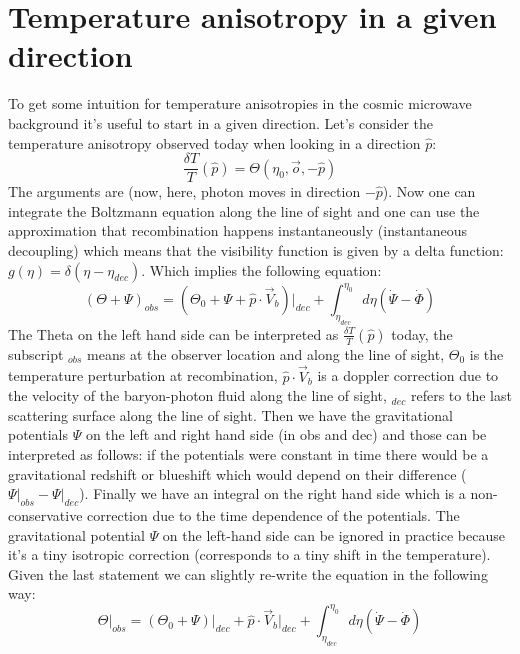 \documentclass{article}
\begin{document}
\section{Temperature anisotropy in a given direction}
To get some intuition for temperature anisotropies in the cosmic microwave background it's useful to start in a given direction. Let's consider the temperature anisotropy observed today when looking in a direction $\hat{p}$:
\begin{equation}
\frac{\delta T}{T}(\hat{p}) = \Theta(\eta_0,\vec{o},-\hat{p})
\end{equation}
The arguments are (now, here, photon moves in direction $-\hat{p}$). Now one can integrate the Boltzmann equation along the line of sight and one can use the approximation that recombination happens instantaneously (instantaneous decoupling) which means that the visibility function is given by a delta function: $g(\eta)=\delta(\eta-\eta_{dec})$. Which implies the following equation:
\begin{equation}
  (\Theta + \Psi)_{obs} = \left(\Theta_0 + \Psi + \hat{p}\cdot\vec{V}_b\right)\bigg|_{dec} + \int_{\eta_{dec}}^{\eta_0}d\eta (\dot{\Psi} - \dot{\Phi})
\end{equation}
The Theta on the left hand side can be interpreted as $\frac{\delta T}{T}(\hat{p})$ today, the subscript $_{obs}$ means at the observer location and along the line of sight, $\Theta_0$ is the temperature perturbation at recombination, $\hat{p}\cdot\vec{V}_b$ is a doppler correction due to the velocity of the baryon-photon fluid along the line of sight, $_{dec}$ refers to the last scattering surface along the line of sight. Then we have the gravitational potentials $\Psi$ on the left and right hand side (in obs and dec) and those can be interpreted as follows: if the potentials were constant in time there would be a gravitational redshift or blueshift which would depend on their difference
($\Psi\big|_{obs} - \Psi\big|_{dec}$). Finally we have an integral on the right hand side which is a non-conservative correction due to the time dependence of the potentials. The gravitational potential $\Psi$ on the left-hand side can be ignored in practice because it's a tiny isotropic correction (corresponds to a tiny shift in the temperature).
Given the last statement we can slightly re-write the equation in the following way:
\begin{equation}
  \Theta|_{obs} = \left(\Theta_0 + \Psi\right)\big|_{dec} + \hat{p}\cdot\vec{V}_b\big|_{dec} + \int_{\eta_{dec}}^{\eta_0}d\eta (\dot{\Psi} - \dot{\Phi})
\end{equation}
\end{document}
